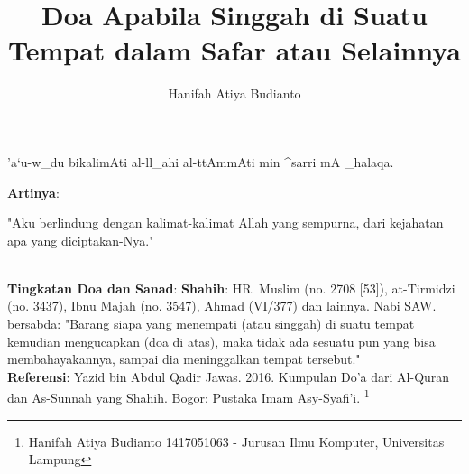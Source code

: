 \documentclass[a4paper,12pt]{article}
\title{\Large Doa Apabila Singgah di Suatu Tempat dalam Safar atau Selainnya}
\author{\calligra Hanifah Atiya Budianto}
\begin{document}
\sffamily
\maketitle 
\fullvocalize
{}
\begin{arabtext}
\noindent
'a`u-w_du bikalimAti al-ll_ahi al-ttAmmAti min ^sarri mA _halaqa.\\
\end{arabtext}
\noindent
\textbf{Artinya}:
\par
\indent
"Aku berlindung dengan kalimat-kalimat Allah yang sempurna, dari kejahatan 
apa yang diciptakan-Nya."\\\\
\par
\noindent
\textbf{Tingkatan Doa dan Sanad}: \textbf{Shahih}: HR. Muslim (no. 2708 
[53]), at-Tirmidzi (no. 3437), Ibnu Majah (no. 3547), Ahmad (VI/377) dan 
lainnya. Nabi SAW. bersabda: "Barang siapa yang menempati (atau singgah) di
suatu tempat kemudian mengucapkan (doa di atas), maka tidak ada sesuatu pun
yang bisa membahayakannya, sampai dia meninggalkan tempat tersebut."\\
\textbf{Referensi}: Yazid bin Abdul Qadir Jawas. 2016. Kumpulan Do'a dari
Al-Quran dan As-Sunnah yang Shahih. Bogor: Pustaka Imam Asy-Syafi'i.
\footnote{Hanifah Atiya Budianto 1417051063 - Jurusan Ilmu Komputer,
Universitas Lampung}
\end{document}
